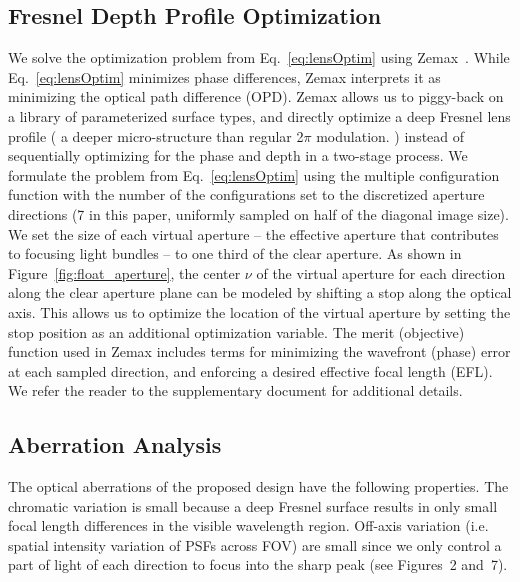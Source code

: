 

 
\subsection{Fresnel Depth Profile Optimization} 
We solve the optimization problem from Eq.~\ref{eq:lensOptim} using
Zemax~\cite{geary2002introduction}.  While Eq.~\ref{eq:lensOptim} minimizes phase differences, Zemax interprets it as minimizing the optical path difference (OPD). 
Zemax allows us to piggy-back on a library of parameterized surface types, and directly
optimize a deep Fresnel lens profile ( a deeper micro-structure than regular 2$\pi$ modulation. ) instead of sequentially optimizing for the
phase and depth in a two-stage process.   We formulate the problem from Eq.~\ref{eq:lensOptim} using the multiple configuration function 
with the number of the configurations set to the discretized aperture directions (7 in this paper, uniformly sampled on half of the diagonal image size). We set the
size of each virtual aperture -- the effective aperture that contributes to focusing light bundles -- to one third
of the clear aperture.  As shown in
Figure~\ref{fig:float_aperture}, the center $\nu$ of the virtual
aperture for each direction along the clear aperture plane
can be modeled by shifting a stop along the optical
axis.  This allows us to optimize the location of the virtual aperture
by setting the stop position as an additional optimization
variable.  The merit (objective) function used in Zemax includes terms for
minimizing the wavefront (phase) error at each sampled direction, and
enforcing a desired effective focal length (EFL). 
We refer the reader to the supplementary document for additional details.

 
% 
\vspace{6pt}
\subsection{Aberration Analysis}
%
The optical aberrations of the proposed design have the following properties.
The chromatic variation is small because a deep Fresnel surface results in only small focal length differences in the visible wavelength region.
Off-axis variation (i.e. spatial intensity variation of PSFs 
across FOV) are small since we only control a part of light 
of each direction to focus into the sharp peak
(see Figures~2 and~7).

